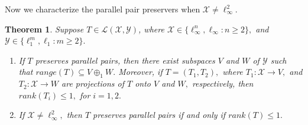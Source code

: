 \documentclass{amsart}
\newtheorem{theorem}{Theorem}[section]
\newtheorem{lemma}[theorem]{Lemma}
\theoremstyle{definition}
\theoremstyle{remark}
\numberwithin{equation}{section}
\begin{document}
Now we characterize the parallel  pair preservers when $\mathcal{X}\neq \ell_\infty^2.$
\begin{theorem}\label{th-inf}
		Suppose $T\in \mathcal{L}(\mathcal{X},\mathcal{Y})$, where  $\mathcal{X}\in\{\ell_\infty^n,\ell_\infty:n\geq 2\},$  and $\mathcal{Y}\in\{\ell_1^m,\ell_1:m\geq 2\}.$  %
		\begin{enumerate}
			\item If $T$ preserves parallel pairs, then there exist subspaces $V$ and $W$ of $\mathcal{Y}$ such that  $range(T)\subseteq V\oplus_1 W.$ Moreover, if $T=(T_1,T_2),$ where $T_1:\mathcal{X}\to V,$ and $T_2:\mathcal{X}\to W$  are projections of $T$ onto $V$ and $W,$ respectively, then $rank(T_i)\leq 1,$ for $i=1,2.$
			\item If $\mathcal{X}\neq \ell_\infty^2,$ then $T$ preserves parallel pairs if and only if $rank(T)\leq 1.$
			\end{enumerate}
\end{theorem}
\end{document}
